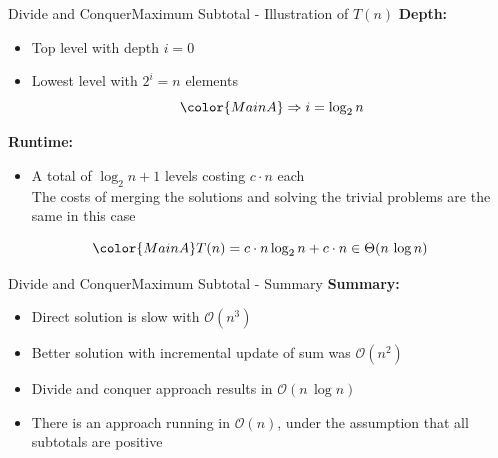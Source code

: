 
\begin{frame}{Divide and Conquer}{Maximum Subtotal - Illustration of $T(n)$}
  \textbf{Depth:}
  \begin{itemize}
    \item<2->
      Top level with depth {\color{MainA}$i = 0$}
    \item<3->
      Lowest level with {\color{MainA}$2^i = n$} elements
      \begin{displaymath}
        {\color{MainA}\Rightarrow i = \log_2 n}
      \end{displaymath}
  \end{itemize}
  \textbf{Runtime:}
  \begin{itemize}
    \item<5->
      A total of {\color{MainA}$\log_2 n + 1$} levels costing
      {\color{MainA}$c \cdot n$} each\\
      \color{gray}
      The costs of merging the solutions and solving the trivial
      problems are the same in this case
  \end{itemize}
  \begin{displaymath}
    {\color{MainA}
    T(n) = c \cdot n \log_2 n + c \cdot n \in \Theta(n\,\log n)}
  \end{displaymath}
\end{frame}


\begin{frame}{Divide and Conquer}{Maximum Subtotal - Summary}
  \textbf{Summary:}
  \begin{itemize}
    \item<2->
      Direct solution is slow with {\color{MainA}$\mathcal{O}(n^3)$}
    \item<3->
      Better solution with incremental update of sum was
      {\color{MainA}$\mathcal{O}(n^2)$}
    \item<4->
      Divide and conquer approach results in
      {\color{MainA}$\mathcal{O}(n\,\log n)$}
    \item<5->
      There is an approach running in {\color{MainA}$\mathcal{O}(n)$},
      under the assumption that all subtotals are positive
  \end{itemize}
\end{frame}

